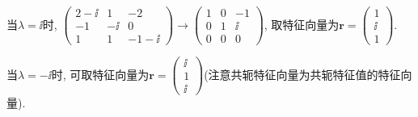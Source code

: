 \begin{solve}
当$\lambda=\ii$时, $\begin{pmatrix}2-\ii&1&-2\\-1&-\ii&0\\1&1&-1-\ii\end{pmatrix}\to\begin{pmatrix}1&0&-1\\0&1&\ii\\0&0&0\end{pmatrix}$, 
取特征向量为$\bm{r}=\begin{pmatrix}1\\\ii\\1\end{pmatrix}$.

当$\lambda=-\ii$时, 可取特征向量为$\bm{r}=\begin{pmatrix}\ii\\1\\\ii\end{pmatrix}$(注意共轭特征向量为共轭特征值的特征向量).


\end{solve}
